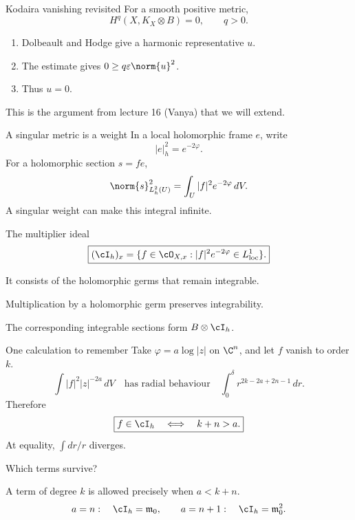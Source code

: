 \begin{frame}{Kodaira vanishing revisited}
For a smooth positive metric,
\[
H^q(X,K_X\otimes B)=0,\qquad q>0.
\]
\begin{enumerate}
\setlength{\itemsep}{12pt}
\item Dolbeault and Hodge give a harmonic representative \(u\).
\item The estimate gives \(0\ge q\varepsilon\norm{u}^2\).
\item Thus \(u=0\).
\end{enumerate}
\medskip
This is the argument from lecture 16 (Vanya) that we will extend.
\end{frame}

\begin{frame}{A singular metric is a weight}
In a local holomorphic frame \(e\), write
\[
|e|_h^2=e^{-2\varphi}.
\]
For a holomorphic section \(s=fe\),
\[
\norm{s}_{L^2_h(U)}^2=\int_U |f|^2e^{-2\varphi}\,dV.
\]
A singular weight can make this integral infinite.
\end{frame}

\begin{frame}{The multiplier ideal}
\[
\boxed{(\cI_h)_x=
\{f\in\cO_{X,x}:|f|^2e^{-2\varphi}\in L^1_{\rm loc}\}.}
\]
\medskip
\par It consists of the holomorphic germs that remain integrable.
\par Multiplication by a holomorphic germ preserves integrability.
\medskip
\par The corresponding integrable sections form \(B\otimes\cI_h\).
\end{frame}

\begin{frame}{One calculation to remember}
Take \(\varphi=a\log|z|\) on \(\C^n\), and let \(f\) vanish to order \(k\).
\[
\int |f|^2|z|^{-2a}\,dV
\quad\text{has radial behaviour}\quad
\int_0^\delta r^{2k-2a+2n-1}\,dr.
\]
Therefore
\[
\boxed{f\in\cI_h\quad\Longleftrightarrow\quad k+n>a.}
\]
At equality, \(\int dr/r\) diverges.
\end{frame}

\begin{frame}{Which terms survive?}
\begin{center}
\end{center}
A term of degree \(k\) is allowed precisely when \(a<k+n\).
\[
a=n:\quad\cI_h=\mathfrak m_0,
\qquad
a=n+1:\quad\cI_h=\mathfrak m_0^2.
\]
\end{frame}

